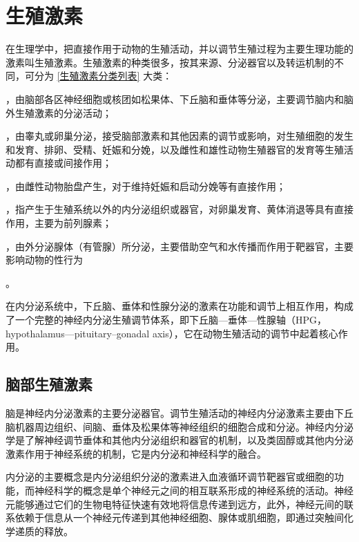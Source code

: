 \chapter{生殖激素}

在生理学中，把直接作用于动物的生殖活动，并以调节生殖过程为主要生理功能的激素叫生殖激素。生殖激素的种类很多，按其来源、分泌器官以及转运机制的不同，可分为 \ref{生殖激素分类列表} 大类：\begin{inparaenum}\item {}，由脑部各区神经细胞或核团如松果体、下丘脑和垂体等分泌，主要调节脑内和脑外生殖激素的分泌活动；\item {}，由睾丸或卵巢分泌，接受脑部激素和其他因素的调节或影响，对生殖细胞的发生和发育、排卵、受精、妊娠和分娩，以及雌性和雄性动物生殖器官的发育等生殖活动都有直接或间接作用；\item {}，由雌性动物胎盘产生，对于维持妊娠和启动分娩等有直接作用；\item {}，指产生于生殖系统以外的内分泌组织或器官，对卵巢发育、黄体消退等具有直接作用，主要为前列腺素；\item {}，由外分泌腺体（有管腺）所分泌，主要借助空气和水传播而作用于靶器官，主要影响动物的性行为\label{生殖激素分类列表}\end{inparaenum}。

在内分泌系统中，下丘脑、垂体和性腺分泌的激素在功能和调节上相互作用，构成了一个完整的神经内分泌生殖调节体系，即下丘脑---垂体---性腺轴（HPG，hypothalamus---pituitary--gonadal axis），它在动物生殖活动的调节中起着核心作用。

\section{脑部生殖激素}

脑是神经内分泌激素的主要分泌器官。调节生殖活动的神经内分泌激素主要由下丘脑机器周边组织、间脑、垂体及松果体等神经组织的细胞合成和分泌。神经内分泌学是了解神经调节垂体和其他内分泌组织和器官的机制，以及类固醇或其他内分泌激素作用于神经系统的机制，它是内分泌和神经科学的融合。

内分泌的主要概念是内分泌组织分泌的激素进入血液循环调节靶器官或细胞的功能，而神经科学的概念是单个神经元之间的相互联系形成的神经系统的活动。神经元能够通过它们的生物电特征快速有效地将信息传递到远方，此外，神经元间的联系依赖于信息从一个神经元传递到其他神经细胞、腺体或肌细胞，即通过突触间化学递质的释放。

